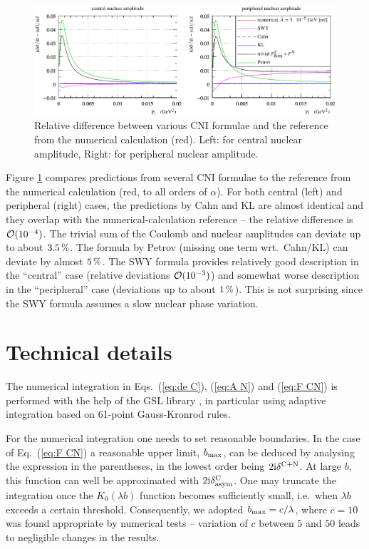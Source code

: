 \documentclass[pdftex,twocolumn,epjc3]{svjour3}
\def\un#1{\,{\rm #1}}
\def\I{{\rm i}}
\begin{document}
\begin{figure}[h]
\begin{center}
\includegraphics{fig/cni_dsdt_cmp_formula.pdf}
\caption{Relative difference between various CNI formulae and the reference from the numerical calculation (red). Left: for central nuclear amplitude, Right: for peripheral nuclear amplitude.}
\label{f:sig form}
\end{center}
\end{figure}

Figure \ref{f:sig form} compares predictions from several CNI formulae to the reference from the numerical calculation (red, to all orders of $\alpha$). For both central (left) and peripheral (right) cases, the predictions by Cahn and KL are almost identical and they overlap with the numerical-calculation reference -- the relative difference is ${\cal O}(10^{-4})$. The trivial sum of the Coulomb and nuclear amplitudes can deviate up to about $3.5\un{\%}$. The formula by Petrov (missing one term wrt.~Cahn/KL) can deviate by almost $5\un{\%}$. The SWY formula provides relatively good description in the ``central'' case (relative deviations ${\cal O}(10^{-3})$) and somewhat worse description in the ``peripheral'' case (deviations up to about $1\un{\%}$). This is not surprising since the SWY formula assumes a slow nuclear phase variation.



\section{Technical details}
\label{sec:technical}

The numerical integration in Eqs.~(\ref{eq:de C}), (\ref{eq:A N}) and (\ref{eq:F CN}) is performed with the help of the GSL library \cite{gsl}, in particular using adaptive integration based on 61-point Gauss-Kronrod rules.

For the numerical integration one needs to set reasonable boundaries. In the case of Eq.~(\ref{eq:F CN}) a reasonable upper limit, $b_{\rm max}$, can be deduced by analysing the expression in the parentheses, in the lowest order being $2\I\delta^{\rm C+N}$. At large $b$, this function can well be approximated with $2\I\delta^{\rm C}_{\rm asym}$. One may truncate the integration once the $K_0(\lambda b)$ function becomes sufficiently small, i.e.~when $\lambda b$ exceeds a certain threshold. Consequently, we adopted $b_{\rm max} = c / \lambda$, where $c = 10$ was found appropriate by numerical tests -- variation of $c$ between $5$ and $50$ leads to negligible changes in the results.
\end{document}
